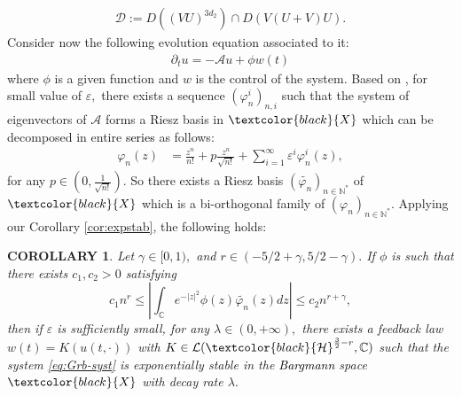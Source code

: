 \documentclass[11pt, dvipsnames]{amsart}
\newtheorem{corollary}[theorem]{COROLLARY}
\begin{document}
\begin{align*}
    \mathcal{D}:=D((VU)^{3d_2})\cap D(V(U+V)U).
\end{align*} Consider now the following evolution equation associated to it:
\begin{align}
    \partial_t u=-\mathcal{A}u+\phi w(t) \label{eq:Grb-syst}
\end{align} where $\phi$ is a given function and $w$ is the control of the system. Based on \cite[section 4.2]{Feki2014-riesz}, for small value of $\varepsilon,$ there exists a sequence $(\varphi_n^i)_{n,i}$ such that the system of eigenvectors of $\mathcal{A}$ forms a Riesz basis in $\textcolor{black}{X}$ which can be decomposed in entire \textcolor{black}{series} as follows:
\begin{align*}
    \varphi_n(z)&=\frac{z^n}{n!}+p\frac{z^n}{\sqrt{n!}}+\sum_{i=1}^{\infty}\varepsilon^i \varphi_n^i(z),
\end{align*} for any $p\in (0,\frac{1}{\sqrt{n!}}).$ So there exists a Riesz basis $(\widetilde{\varphi_n})_{n\in \mathbb{N}^*}$ of $\textcolor{black}{X}$ which is a bi-orthogonal family of $(\varphi_n)_{n\in \mathbb{N}^*}.$ Applying our Corollary \ref{cor:expstab}, the following holds:
\begin{corollary}\label{cor-Gribov}
    Let $\gamma\in [0,1),$ and $r\in (-5/2+\gamma,5/2-\gamma).$ If $\phi$ is such that there exists $c_1,c_2>0$ satisfying
    \begin{equation*}
        c_1 n^{r}\leq \left|\int_{\mathbb{C}}e^{-|z|^2}\phi(z)\widetilde{\varphi_n}(z)dz\right|\leq c_2 n^{r+\gamma},
    \end{equation*} then if $\varepsilon$ is sufficiently small, for any $\lambda\in (0,+\infty),$ there exists a feedback law $w(t)=K(u(t, \cdot))$ with $K\in \mathcal{L}(\textcolor{black}{\mathcal{H}}^{\frac{3}{2}-r},\mathbb{C})$
    such that 
    the system \eqref{eq:Grb-syst} is exponentially stable in the \textcolor{black}{Bargmann} space $\textcolor{black}{X}$ with decay rate $\lambda.$
\end{corollary}
\end{document}
